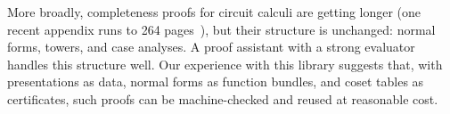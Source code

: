 More broadly, completeness proofs for circuit
calculi are getting longer (one recent appendix runs to 264
pages~\cite{clement2026realcliffordch}), but their structure
is unchanged: normal forms, towers, and case analyses.
A proof assistant with a strong evaluator handles this structure well.
Our experience with this library suggests that, with
presentations as data, normal forms as function bundles, and coset tables
as certificates, such proofs can be machine-checked and reused at
reasonable cost.
